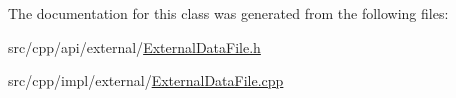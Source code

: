 The documentation for this class was generated from the following files:\begin{DoxyCompactItemize}
\item 
src/cpp/api/external/\hyperlink{ExternalDataFile_8h}{ExternalDataFile.h}\item 
src/cpp/impl/external/\hyperlink{ExternalDataFile_8cpp}{ExternalDataFile.cpp}\end{DoxyCompactItemize}
